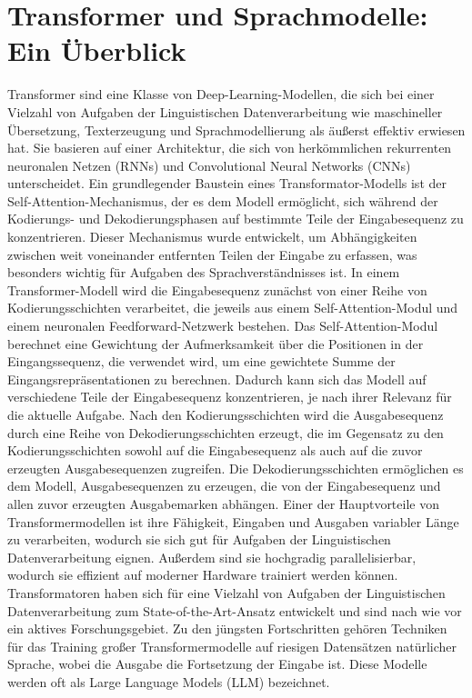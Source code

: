 \section{Transformer und Sprachmodelle: Ein Überblick}
\label{subsec:Foundations:Transformer}
Transformer sind eine Klasse von Deep-Learning-Modellen, die sich bei einer Vielzahl von Aufgaben der Linguistischen Datenverarbeitung wie maschineller Übersetzung, Texterzeugung und Sprachmodellierung als äußerst effektiv erwiesen hat.
Sie basieren auf einer Architektur, die sich von herkömmlichen rekurrenten neuronalen Netzen (RNNs) und Convolutional Neural Networks (CNNs) unterscheidet.
Ein grundlegender Baustein eines Transformator-Modells ist der Self-Attention-Mechanismus, der es dem Modell ermöglicht, sich während der Kodierungs- und Dekodierungsphasen auf bestimmte Teile der Eingabesequenz zu konzentrieren.
Dieser Mechanismus wurde entwickelt, um Abhängigkeiten zwischen weit voneinander entfernten Teilen der Eingabe zu erfassen, was besonders wichtig für Aufgaben des Sprachverständnisses ist.
In einem Transformer-Modell wird die Eingabesequenz zunächst von einer Reihe von Kodierungsschichten verarbeitet, die jeweils aus einem Self-Attention-Modul und einem neuronalen Feedforward-Netzwerk bestehen.
Das Self-Attention-Modul berechnet eine Gewichtung der Aufmerksamkeit über die Positionen in der Eingangssequenz, die verwendet wird, um eine gewichtete Summe der Eingangsrepräsentationen zu berechnen.
Dadurch kann sich das Modell auf verschiedene Teile der Eingabesequenz konzentrieren, je nach ihrer Relevanz für die aktuelle Aufgabe.
Nach den Kodierungsschichten wird die Ausgabesequenz durch eine Reihe von Dekodierungsschichten erzeugt, die im Gegensatz zu den Kodierungsschichten sowohl auf die Eingabesequenz als auch auf die zuvor erzeugten Ausgabesequenzen zugreifen.
Die Dekodierungsschichten ermöglichen es dem Modell, Ausgabesequenzen zu erzeugen, die von der Eingabesequenz und allen zuvor erzeugten Ausgabemarken abhängen.
Einer der Hauptvorteile von Transformermodellen ist ihre Fähigkeit, Eingaben und Ausgaben variabler Länge zu verarbeiten, wodurch sie sich gut für Aufgaben der Linguistischen Datenverarbeitung eignen.
Außerdem sind sie hochgradig parallelisierbar, wodurch sie effizient auf moderner Hardware trainiert werden können.
Transformatoren haben sich für eine Vielzahl von Aufgaben der Linguistischen Datenverarbeitung zum State-of-the-Art-Ansatz entwickelt und sind nach wie vor ein aktives Forschungsgebiet.
Zu den jüngsten Fortschritten gehören Techniken für das Training großer Transformermodelle auf riesigen Datensätzen natürlicher Sprache, wobei die Ausgabe die Fortsetzung der Eingabe ist.
Diese Modelle werden oft als Large Language Models (LLM) bezeichnet.

